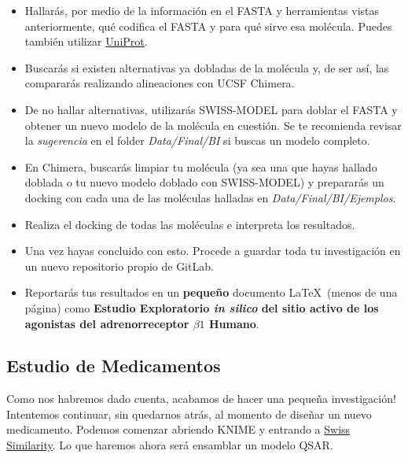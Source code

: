 \documentclass[10pt,letterpaper]{article}
\begin{document}
\begin{itemize}
\item Hallar\'as, por medio de la informaci\'on en el FASTA y herramientas vistas anteriormente, qu\'e codifica el FASTA y para qu\'e sirve esa mol\'ecula. Puedes tambi\'en utilizar \href{http://www.uniprot.org/}{UniProt}.
\item Buscar\'as si existen alternativas ya dobladas de la mol\'ecula y, de ser as\'i, las comparar\'as realizando alineaciones con UCSF Chimera.
\item De no hallar alternativas, utilizar\'as SWISS-MODEL para doblar el FASTA y obtener un nuevo modelo de la mol\'ecula en cuesti\'on. Se te recomienda revisar la \textit{sugerencia} en el folder \textit{Data/Final/BI} si buscas un modelo completo.
\item En Chimera, buscar\'as limpiar tu mol\'ecula (ya sea una que hayas hallado doblada o tu nuevo modelo doblado con SWISS-MODEL) y preparar\'as un docking con cada una de las mol\'eculas halladas en \textit{Data/Final/BI/Ejemplos}.
\item Realiza el docking de todas las mol\'eculas e interpreta los resultados.
\item Una vez hayas concluido con esto. Procede a guardar toda tu investigaci\'on en un nuevo repositorio propio de GitLab.
\item Reportar\'as tus resultados en un \textbf{peque\~no} documento \LaTeX\ (menos de una p\'agina) como \textbf{Estudio Exploratorio \emph{in silico} del sitio activo de los agonistas del adrenorreceptor $\beta 1$ Humano}.
\end{itemize}

\subsection{Estudio de Medicamentos}
Como nos habremos dado cuenta, acabamos de hacer una peque\~na investigaci\'on! Intentemos continuar, sin quedarnos atr\'as, al momento de dise\~nar un nuevo medicamento. Podemos comenzar abriendo KNIME y entrando a \href{http://www.swisssimilarity.ch/}{Swiss  Similarity}. Lo que haremos ahora ser\'a ensamblar un modelo QSAR.\\
\end{document}
